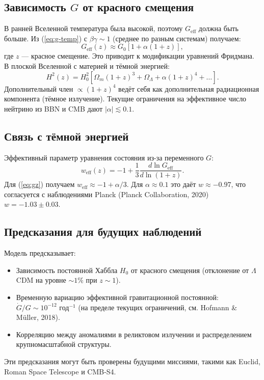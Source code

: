 \documentclass[12pt]{article}
\theoremstyle{remark}
\begin{document}
	\subsection{Зависимость $G$ от красного смещения}
	\label{subsec:cosmo-gz}
	
	В ранней Вселенной температура была высокой, поэтому $G_{\text{eff}}$ должна быть больше. Из (\ref{eq:g-temp}) с $\beta\gamma \sim 1$ (среднее по разным системам) получаем:
	\begin{equation}
		G_{\text{eff}}(z) \approx G_0 \left[ 1 + \alpha (1+z) \right],
		\label{eq:gz}
	\end{equation}
	где $z$ — красное смещение. Это приводит к модификации уравнений Фридмана. В плоской Вселенной с материей и тёмной энергией:
	\begin{equation}
		H^2(z) = H_0^2 \left[ \Omega_m (1+z)^3 + \Omega_\Lambda + \alpha (1+z)^4 + \dots \right].
		\label{eq:friedmann}
	\end{equation}
	Дополнительный член $\propto (1+z)^4$ ведёт себя как дополнительная радиационная компонента (тёмное излучение). Текущие ограничения на эффективное число нейтрино из BBN и CMB дают $|\alpha| \lesssim 0.1$.
	
	\subsection{Связь с тёмной энергией}
	\label{subsec:cosmo-de}
	
	Эффективный параметр уравнения состояния из-за переменного $G$:
	\begin{equation}
		w_{\text{eff}}(z) = -1 + \frac{1}{3} \frac{d \ln G_{\text{eff}}}{d \ln(1+z)}.
		\label{eq:weff}
	\end{equation}
	Для (\ref{eq:gz}) получаем $w_{\text{eff}} \approx -1 + \alpha/3$. Для $\alpha \approx 0.1$ это даёт $w \approx -0.97$, что согласуется с наблюдениями Planck (Planck Collaboration, 2020) $w = -1.03 \pm 0.03$.
	
	\subsection{Предсказания для будущих наблюдений}
	\label{subsec:cosmo-predictions}
	
	Модель предсказывает:
	\begin{itemize}
		\item Зависимость постоянной Хаббла $H_0$ от красного смещения (отклонение от $\Lambda$CDM на уровне $\sim 1\%$ при $z\sim 1$).
		\item Временную вариацию эффективной гравитационной постоянной: $\dot{G}/G \sim 10^{-12}$ год$^{-1}$ (на пределе текущих ограничений, см. Hofmann \& Müller, 2018).
		\item Корреляцию между аномалиями в реликтовом излучении и распределением крупномасштабной структуры.
	\end{itemize}
	Эти предсказания могут быть проверены будущими миссиями, такими как Euclid, Roman Space Telescope и CMB-S4.
	
\end{document}
